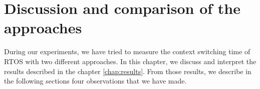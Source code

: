 \chapter{Discussion and comparison of the approaches\label{chap:discuss}}

During our experiments, we have tried to measure the context switching time of RTOS with two different approaches.
In this chapter, we discuss and interpret the results described in the chapter \ref{chap:results}.
From those results, we describe in the following sections four observations that we have made.




